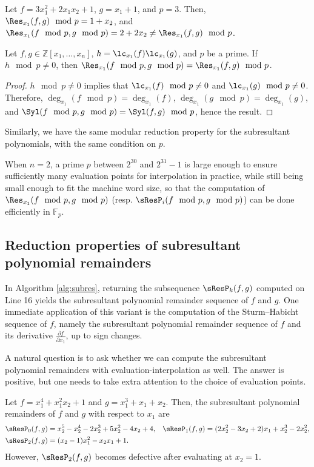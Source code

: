 \begin{example}
    Let $f=3x_1^2+2x_1x_2+1$, $g=x_1+1$, and $p=3$. Then, $\Res_{x_1}(f,g)\mod p=1+x_2$, and $\Res_{x_1}(f\mod p,g\mod p)=2+2x_2\neq\Res_{x_1}(f,g)\mod p$.
\end{example}

\begin{proposition}
    Let $f,g\in\mathbb{Z}[x_1,\dots,x_n]$, $h=\lc_{x_1}(f)\lc_{x_1}(g)$, and $p$ be a prime. If $h\mod p\neq 0$, then $\Res_{x_1}(f\mod p,g\mod p)=\Res_{x_1}(f,g)\mod p$.
\end{proposition}

\begin{proof}
    $h\mod p\neq 0$ implies that $\lc_{x_1}(f)\mod p\neq 0$ and $\lc_{x_1}(g)\mod p\neq 0$. Therefore, $\deg_{x_1}(f\mod p)=\deg_{x_1}(f)$, $\deg_{x_1}(g\mod p)=\deg_{x_1}(g)$, and $\Syl(f\mod p,g\mod p)=\Syl(f,g)\mod p$, hence the result.
\end{proof}

Similarly, we have the same modular reduction property for the subresultant polynomials, with the same condition on $p$.

When $n=2$, a prime $p$ between $2^{30}$ and $2^{31}-1$ is large enough to ensure sufficiently many evaluation points for interpolation in practice, while still being small enough to fit the machine word size, so that the computation of $\Res_{x_1}(f\mod p, g\mod p)$ (resp. $\sResP_i(f\mod p, g\mod p)$) can be done efficiently in $\mathbb{F}_p$.


\subsection{Reduction properties of subresultant polynomial remainders}

In Algorithm \ref{alg:subres}, returning the subsequence $\sResP_k(f,g)$ computed on Line 16 yields the subresultant polynomial remainder sequence of $f$ and $g$. One immediate application of this variant is the computation of the Sturm–Habicht sequence of $f$, namely the subresultant polynomial remainder sequence of $f$ and its derivative $\frac{\partial f}{\partial x_1}$, up to sign changes.

A natural question is to ask whether we can compute the subresultant polynomial remainders with evaluation-interpolation as well. The answer is positive, but one needs to take extra attention to the choice of evaluation points.

\begin{example}
    Let $f=x_1^4+x_1^2x_2+1$ and $g=x_1^3+x_1+x_2$. Then, the subresultant polynomial remainders of $f$ and $g$ with respect to $x_1$ are
    \begin{align*}
        \sResP_{0}(f,g) & =x_2^5-x_2^4-2x_2^3+5x_2^2-4x_2+4, & \sResP_{1}(f,g) & =(2x_2^2-3x_2+2)x_1+x_2^3-2x_2^2, \\
        \sResP_{2}(f,g) & =(x_2-1)x_1^2-x_2x_1+1.
    \end{align*}
    However, $\sResP_{2}(f,g)$ becomes defective after evaluating at $x_2=1$.
\end{example}

